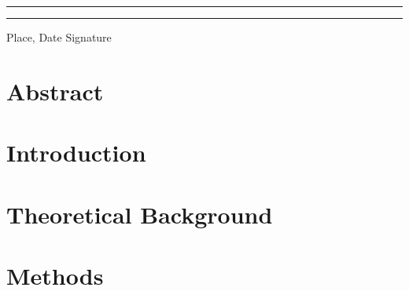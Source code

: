 \documentclass[12pt, bibliography=totoc]{scrartcl}
\begin{document}
    \rule{4cm}{0.5mm} \tab \rule{4cm}{0.5mm}

    Place, Date \tab Signature

    \newpage

    \tableofcontents

    \newpage
    \onehalfspacing


    \section{Abstract}\label{sec:abstract}


    \section{Introduction}
    \label{sec:introduction}
    


    \section{Theoretical Background}
    \label{sec:background}
    


    \section{Methods}
    \label{sec:methods}
\end{document}
